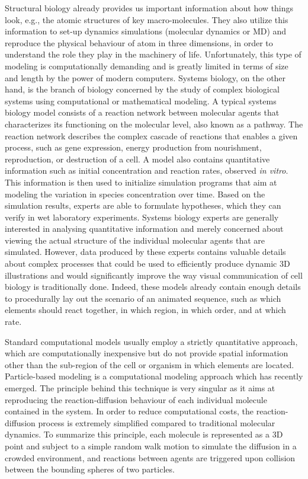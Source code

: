 Structural biology already provides us important information about how things look, e.g., the atomic structures of key macro-molecules.
They also utilize this information to set-up dynamics simulations (molecular dynamics or MD) and reproduce the physical behaviour of atom in three dimensions, in order to understand the role they play in the machinery of life.
Unfortunately, this type of modeling is computationally demanding and is greatly limited in terms of size and length by the power of modern computers.
Systems biology, on the other hand, is the branch of biology concerned by the study of complex biological systems using computational or mathematical modeling.
A typical systems biology model consists of a reaction network between molecular agents that characterizes its functioning on the molecular level, also known as a pathway.
The reaction network describes the complex cascade of reactions that enables a given process, such as gene expression, energy production from nourishment, reproduction, or destruction of a cell.
A model also contains quantitative information such as initial concentration and reaction rates, observed \textit{in vitro}.
This information is then used to initialize simulation programs that aim at modeling the variation in species concentration over time.
Based on the simulation results, experts are able to formulate hypotheses, which they can verify in wet laboratory experiments.
Systems biology experts are generally interested in analysing quantitative information and merely concerned about viewing the actual structure of the individual molecular agents that are simulated.
However, data produced by these experts contains valuable details about complex processes that could be used to efficiently produce dynamic 3D illustrations and would significantly improve the way visual communication of cell biology is traditionally done. 
Indeed, these models already contain enough details to procedurally lay out the scenario of an animated sequence, such as which elements should react together, in which region, in which order, and at which rate.

Standard computational models usually employ a strictly quantitative approach, which are computationally inexpensive but do not provide spatial information other than the sub-region of the cell or organism in which elements are located.
Particle-based modeling is a computational modeling approach which has recently emerged.
The principle behind this technique is very singular as it aims at reproducing the reaction-diffusion behaviour of each individual molecule contained in the system.
In order to reduce computational costs, the reaction-diffusion process is extremely simplified compared to traditional molecular dynamics.
To summarize this principle, each molecule is represented as a 3D point and subject to a simple random walk motion to simulate the diffusion in a crowded environment, and reactions between agents are triggered upon collision between the bounding spheres of two particles.

